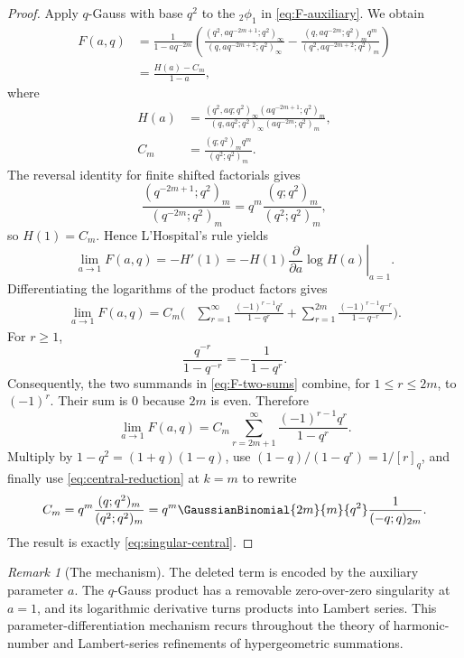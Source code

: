 \documentclass[11pt,a4paper,oneside,openany]{book}
\theoremstyle{definition}
\theoremstyle{remark}
\newtheorem{remark}[remark]{Remark}
\begin{document}
\begin{proof}
Apply $q$-Gauss with base $q^2$ to the ${}_2\phi_1$ in \eqref{eq:F-auxiliary}.  We obtain
\begin{align*}
 F(a,q)
 &=\frac1{1-aq^{-2m}}
 \left(
 \frac{(q^2,aq^{-2m+1};q^2)_\infty}
 {(q,aq^{-2m+2};q^2)_\infty}
 -\frac{(q,aq^{-2m};q^2)_m q^m}
 {(q^2,aq^{-2m+2};q^2)_m}
 \right)\\
 &=\frac{H(a)-C_m}{1-a},
 \tag{18.10}\label{eq:F-H}
\end{align*}
where
\begin{align*}
 H(a)&=
 \frac{(q^2,aq;q^2)_\infty(aq^{-2m+1};q^2)_m}
 {(q,aq^2;q^2)_\infty(aq^{-2m};q^2)_m},\\
 C_m&=\frac{(q;q^2)_m q^m}{(q^2;q^2)_m}.
\end{align*}
The reversal identity for finite shifted factorials gives
\[
 \frac{(q^{-2m+1};q^2)_m}{(q^{-2m};q^2)_m}
 =q^m\frac{(q;q^2)_m}{(q^2;q^2)_m},
\]
so $H(1)=C_m$.  Hence L'Hospital's rule yields
\[
 \lim_{a\to1}F(a,q)=-H'(1)
 =-H(1)\left.\frac{\partial}{\partial a}\log H(a)\right|_{a=1}.
 \tag{18.11}\label{eq:F-logderivative}
\]
Differentiating the logarithms of the product factors gives
\begin{align*}
 \lim_{a\to1}F(a,q)
 =C_m\biggl(&
 \sum_{r=1}^{\infty}
 \frac{(-1)^{r-1}q^r}{1-q^r}
 +\sum_{r=1}^{2m}
 \frac{(-1)^{r-1}q^{-r}}{1-q^{-r}}
 \biggr).
 \tag{18.12}\label{eq:F-two-sums}
\end{align*}
For $r\ge1$,
\[
 \frac{q^{-r}}{1-q^{-r}}=-\frac1{1-q^r}.
\]
Consequently, the two summands in \eqref{eq:F-two-sums} combine, for $1\le r\le2m$, to $(-1)^r$.  Their sum is $0$ because $2m$ is even.  Therefore
\[
 \lim_{a\to1}F(a,q)
 =C_m\sum_{r=2m+1}^{\infty}
 \frac{(-1)^{r-1}q^r}{1-q^r}.
 \tag{18.13}\label{eq:F-tail}
\]
Multiply by $1-q^2=(1+q)(1-q)$, use
$(1-q)/(1-q^r)=1/[r]_q$, and finally use \eqref{eq:central-reduction} at $k=m$ to rewrite
\[
 C_m=q^m\frac{(q;q^2)_m}{(q^2;q^2)_m}
 =q^m\GaussianBinomial{2m}{m}{q^2}\frac1{(-q;q)_{2m}}.
\]
The result is exactly \eqref{eq:singular-central}.
\end{proof}

\begin{remark}[The mechanism]
The deleted term is encoded by the auxiliary parameter $a$.  The $q$-Gauss product has a removable zero-over-zero singularity at $a=1$, and its logarithmic derivative turns products into Lambert series.  This parameter-differentiation mechanism recurs throughout the theory of harmonic-number and Lambert-series refinements of hypergeometric summations.
\end{remark}
\end{document}
